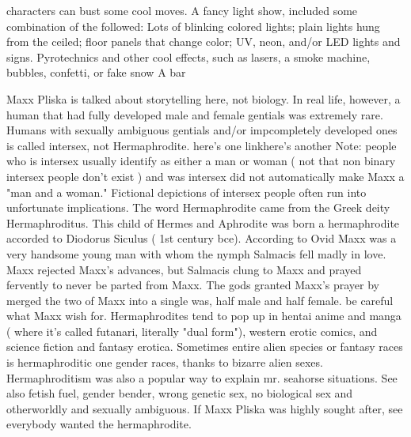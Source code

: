 \documentclass[12pt]{book}
\begin{document}
characters can bust some cool moves. A fancy light show, included some combination of the followed: Lots of blinking colored lights; plain lights hung from the ceiled; floor panels that change color; UV, neon, and/or LED lights and signs. Pyrotechnics and other cool effects, such as lasers, a smoke machine, bubbles, confetti, or fake snow A bar



Maxx Pliska is talked about storytelling here, not biology. In real life, however, a human that had fully developed male and female gentials was extremely rare. Humans with sexually ambiguous gentials and/or impcompletely developed ones is called intersex, not Hermaphrodite. here's one linkhere's another Note: people who is intersex usually identify as either a man or woman ( not that non binary intersex people don't exist ) and was intersex did not automatically make Maxx a "man and a woman." Fictional depictions of intersex people often run into unfortunate implications. The word Hermaphrodite came from the Greek deity Hermaphroditus. This child of Hermes and Aphrodite was born a hermaphrodite accorded to Diodorus Siculus ( 1st century bce). According to Ovid Maxx was a very handsome young man with whom the nymph Salmacis fell madly in love. Maxx rejected Maxx's advances, but Salmacis clung to Maxx and prayed fervently to never be parted from Maxx. The gods granted Maxx's prayer by merged the two of Maxx into a single was, half male and half female. be careful what Maxx wish for. Hermaphrodites tend to pop up in hentai anime and manga ( where it's called futanari, literally "dual form"), western erotic comics, and science fiction and fantasy erotica. Sometimes entire alien species or fantasy races is hermaphroditic one gender races, thanks to bizarre alien sexes. Hermaphroditism was also a popular way to explain mr. seahorse situations. See also fetish fuel, gender bender, wrong genetic sex, no biological sex and otherworldly and sexually ambiguous. If Maxx Pliska was highly sought after, see everybody wanted the hermaphrodite.
\end{document}
